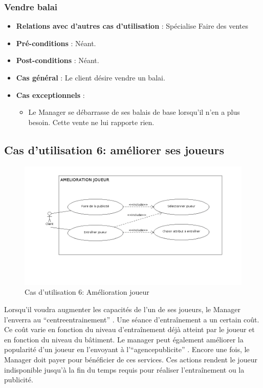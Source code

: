 \documentclass[a4paper,titlepage]{scrreprt}
\begin{document}
    \subsubsection{Vendre balai}
      \begin{itemize}
        \item \textbf{Relations avec d'autres cas d'utilisation}  : Spécialise Faire des ventes
        \item \textbf{Pré-conditions} : Néant.
        \item \textbf{Post-conditions} : Néant.
        \item \textbf{Cas général} : Le client désire vendre un balai.
        \item \textbf{Cas exceptionnels} : 
        \begin{itemize}
            \item Le Manager se débarrasse de ses balais de base lorsqu'il n'en a plus besoin. Cette vente ne lui rapporte rien.
          \end{itemize}
      \end{itemize}

  \subsection{Cas d'utilisation 6: améliorer ses joueurs}
  \begin{figure}[H]
    \center
    \includegraphics[scale=0.5]{uml/useCaseView/Ameliorationjoueur.png}
    \caption{Cas d'utilisation 6: Amélioration joueur}
  \end{figure}
  Lorsqu'il voudra augmenter les capacités de l'un de ses joueurs, 
  le Manager l'enverra au \enquote{\gls{centreentrainement}} . 
  Une séance d'entraînement a un certain coût. 
  Ce coût varie en fonction du niveau d'entraînement déjà atteint par le joueur et en fonction du niveau du bâtiment.
  Le manager peut également améliorer la popularité d'un joueur en l'envoyant à l'\enquote{\gls{agencepublicite}} . Encore une fois, le Manager doit payer pour bénéficier de ces services. Ces actions rendent le joueur indisponible jusqu'à la fin du temps requis pour réaliser l'entraînement ou la publicité.
\end{document}
